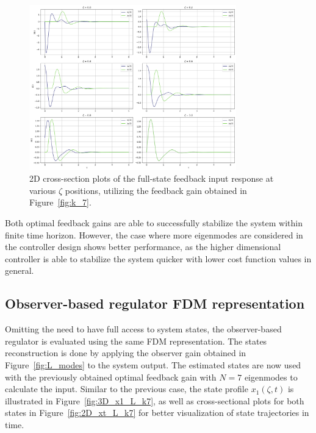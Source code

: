 \begin{figure}[!htbp]
    \centering
    \includegraphics[width=0.8\textwidth]{Figures/2D_xt_k7.png}
    \caption{2D cross-section plots of the full-state feedback input response at various $\zeta$ positions, utilizing the feedback gain obtained in Figure~\ref{fig:k_7}.}
    \label{fig:2D_xt_k7}
\end{figure}

Both optimal feedback gains are able to successfully stabilize the system within finite time horizon. However, the case where more eigenmodes are considered in the controller design shows better performance, as the higher dimensional controller is able to stabilize the system quicker with lower cost function values in general.

\subsection{Observer-based regulator FDM representation} \label{sec:observer}

Omitting the need to have full access to system states, the observer-based regulator is evaluated using the same FDM representation. The states reconstruction is done by applying the observer gain obtained in Figure~\ref{fig:L_modes} to the system output. The estimated states are now used with the previously obtained optimal feedback gain with $N=7$ eigenmodes to calculate the input. Similar to the previous case, the state profile $x_1(\zeta,t)$ is illustrated in Figure~\ref{fig:3D_x1_L_k7}, as well as cross-sectional plots for both states in Figure~\ref{fig:2D_xt_L_k7} for better visualization of state trajectories in time.

